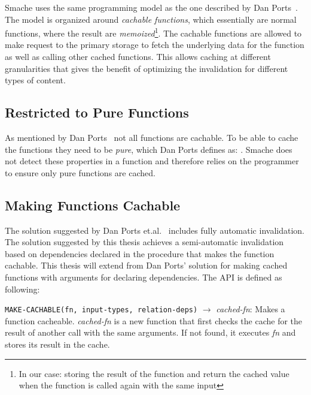 Smache uses the same programming model as the one described by Dan Ports~\cite{paper:liskov}. The model is organized around \emph{cachable functions}, which essentially are normal functions, where the result are \emph{memoized}\footnote{In our case: storing the result of the function and return the cached value when the function is called again with the same input}. The cachable functions are allowed to make request to the primary storage to fetch the underlying data for the function as well as calling other cached functions. This allows caching at different granularities that gives the benefit of optimizing the invalidation for different types of content.


\subsection{Restricted to Pure Functions}
\label{subsec:restricted_to_pure_functions}

As mentioned by Dan Ports~\cite{paper:liskov} not all functions are cachable. To be able to cache the functions they need to be \emph{pure}, which Dan Ports defines as: . Smache does not detect these properties in a function and therefore relies on the programmer to ensure only pure functions are cached.


\subsection{Making Functions Cachable}
\label{subsec:making-functions-cachable}

The solution suggested by Dan Ports et.al.~\cite{paper:liskov} includes fully automatic invalidation. The solution suggested by this thesis achieves a semi-automatic invalidation based on dependencies declared in the procedure that makes the function cachable. This thesis will extend from Dan Ports' solution for making cached functions with arguments for declaring dependencies. The API is defined as following:

\verb$MAKE-CACHABLE(fn, input-types, relation-deps)$ $\rightarrow$ \emph{cached-fn}: Makes a function cacheable. \emph{cached-fn} is a new function that first checks the cache for the result of another call with the same arguments. If not found, it executes \emph{fn} and stores its result in the cache.

